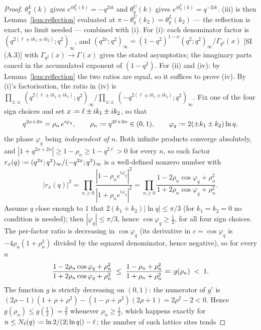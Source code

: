 \documentclass[11pt,a4paper]{article}
\providecommand{\coloneqq}{\mathrel{\vcenter{\baselineskip0.5ex \lineskiplimit0pt
      \hbox{\scriptsize.}\hbox{\scriptsize.}}}=}
\providecommand{\eqqcolon}{=\mathrel{\vcenter{\baselineskip0.5ex \lineskiplimit0pt
      \hbox{\scriptsize.}\hbox{\scriptsize.}}}}}
\theoremstyle{definition}
\theoremstyle{plain}
\begin{document}
\begin{proof}
$\theta^{L}_{q}(k)$ gives $e^{i\theta^{L}_{q}(k)}=-q^{2ik}$ and $\theta^{U}_{q}(k)$ gives
$e^{i\theta^{U}_{q}(k)}=q^{-2ik}$. (iii) is then Lemma~\ref{lem:reflection} evaluated at
$\pi-\theta^{U}_{q}(k_2)=\theta^{L}_{q}(k_2)$ --- the reflection is exact, no limit needed ---
combined with (i). For (i): each denominator factor is
$(q^{2(\ell\pm ik_1\pm ik_2)};q^{2})_{\infty}$, and
$(q^{2x};q^{2})_{\infty}=(1-q^{2})^{1-x}(q^{2};q^{2})_{\infty}/\Gamma_{q^{2}}(x)$
[SI (A.3)] with $\Gamma_{q^{2}}(x)\to\Gamma(x)$ gives the stated asymptotics; the imaginary
parts cancel in the accumulated exponent of $(1-q^{2})$. For (ii) and (iv): by
Lemma~\ref{lem:reflection} the two ratios are equal, so it suffices to prove (iv). By (i)'s
factorisation, the ratio in (iv) is
$\prod_{\pm\pm}(q^{2(\ell\pm ik_1\pm ik_2)};q^{2})_{\infty}
/\prod_{\pm\pm}(-q^{2(\ell\pm ik_1\pm ik_2)};q^{2})_{\infty}$.
Fix one of the four sign choices and set $x\coloneqq\ell\pm ik_{1}\pm ik_{2}$, so that
\[
  q^{2x+2n}=\rho_{n}\,e^{i\varphi_{q}},\qquad
  \rho_{n}\coloneqq q^{2\ell+2n}\in(0,1),\qquad
  \varphi_{q}\coloneqq 2(\pm k_{1}\pm k_{2})\ln q ,
\]
the phase $\varphi_{q}$ being \emph{independent of $n$}. Both infinite products converge
absolutely, and $|1+q^{2x+2n}|\ge1-\rho_{n}\ge1-q^{2\ell}>0$ for every $n$, so each factor
$r_{x}(q)\coloneqq(q^{2x};q^{2})_{\infty}/(-q^{2x};q^{2})_{\infty}$ is a well-defined
nonzero number with
\[
  |r_{x}(q)|^{2}
  =\prod_{n\ge0}\frac{|1-\rho_{n}e^{i\varphi_{q}}|^{2}}{|1+\rho_{n}e^{i\varphi_{q}}|^{2}}
  =\prod_{n\ge0}\frac{1-2\rho_{n}\cos\varphi_{q}+\rho_{n}^{2}}
                     {1+2\rho_{n}\cos\varphi_{q}+\rho_{n}^{2}} .
\]
Assume $q$ close enough to $1$ that $2(k_{1}+k_{2})|\ln q|\le\pi/3$ (for $k_{1}=k_{2}=0$ no
condition is needed); then $|\varphi_{q}|\le\pi/3$, hence $\cos\varphi_{q}\ge\tfrac12$, for
all four sign choices. The per-factor ratio is decreasing in $\cos\varphi_{q}$ (its
derivative in $c=\cos\varphi_{q}$ is $-4\rho_{n}(1+\rho_{n}^{2})$ divided by the squared
denominator, hence negative), so for every $n$
\[
  \frac{1-2\rho_{n}\cos\varphi_{q}+\rho_{n}^{2}}{1+2\rho_{n}\cos\varphi_{q}+\rho_{n}^{2}}
  \;\le\;\frac{1-\rho_{n}+\rho_{n}^{2}}{1+\rho_{n}+\rho_{n}^{2}}\eqqcolon g(\rho_{n})\;<\;1 .
\]
The function $g$ is strictly decreasing on $(0,1)$: the numerator of $g'$ is
$(2\rho-1)(1+\rho+\rho^{2})-(1-\rho+\rho^{2})(2\rho+1)=2\rho^{2}-2<0$. Hence
$g(\rho_{n})\le g(\tfrac12)=\tfrac37$ whenever $\rho_{n}\ge\tfrac12$, which happens exactly
for $n\le N_{\ell}(q)\coloneqq\ln2/(2|\ln q|)-\ell$; the number of such lattice sites tends

\end{proof}
\end{document}
